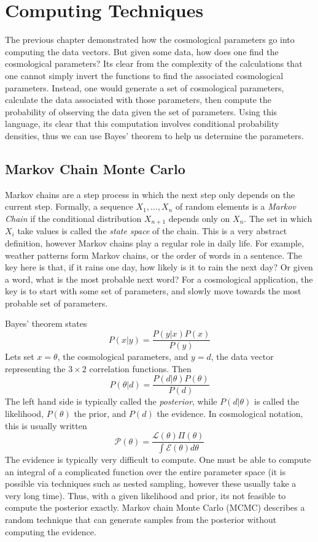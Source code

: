\chapter{Computing Techniques}
The previous chapter demonstrated how the cosmological parameters go into computing the data vectors. But given some data, how does one find the cosmological parameters? Its clear from the complexity of the calculations that one cannot simply invert the functions to find the associated cosmological parameters. Instead, one would generate a set of cosmological parameters, calculate the data associated with those parameters, then compute the probability of observing the data given the set of parameters. Using this language, its clear that this computation involves conditional probability densities, thus we can use Bayes' theorem to help us determine the parameters.

\section{Markov Chain Monte Carlo}
Markov chains are a step process in which the next step only depends on the current step. Formally, a
sequence $X_1,\hdots,X_n$ of random elements is a \textit{Markov Chain} if the conditional distribution $X_{n+1}$ depends only on $X_n$. The set in which $X_i$ take values is called the \textit{state space} of the chain. This is a very abstract definition, however Markov chains play a regular role in daily life. For example, weather patterns form Markov chains, or the order of words in a sentence. The key here is that, if it rains one day, how likely is it to rain the next day? Or given a word, what is the most probable next word? For a cosmological application, the key is to start with some set of parameters, and slowly move towards the most probable set of parameters.

Bayes' theorem states
\begin{equation}
	P(x|y) = \frac{P(y|x) P(x)}{P(y)}
\end{equation}
Lets set $x=\theta$, the cosmological parameters, and $y=d$, the data vector representing the $3\times 2$ correlation functions. Then
\begin{equation}
	P(\theta|d) = \frac{P(d|\theta) P(\theta)}{P(d)}
\end{equation}
The left hand side is typically called the \textit{posterior}, while $P(d|\theta)$ is called the likelihood, $P(\theta)$ the prior, and $P(d)$ the evidence. In cosmological notation, this is usually written
\begin{equation}
	\mathcal{P}(\theta) = \frac{\mathcal{L}(\theta) \Pi(\theta)}{\int\mathcal{E}(\theta)d\theta}
\end{equation}
The evidence is typically very difficult to compute. One must be able to compute an integral of a complicated function over the entire parameter space (it is possible via techniques such as nested sampling, however these usually take a very long time). Thus, with a given likelihood and prior, its not feasible to compute the posterior exactly. Markov chain Monte Carlo (MCMC) describes a random technique that can generate samples from the posterior without computing the evidence.
